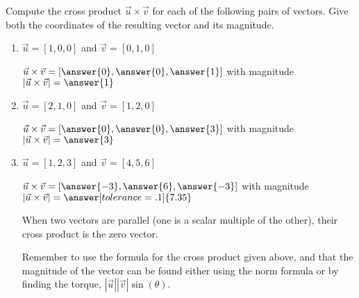 \documentclass{ximera}
\begin{document}
\begin{problem}
    Compute the cross product $\vec{u}\times\vec{v}$ for each of the following pairs of vectors. Give both the coordinates of the resulting vector and its magnitude.
    
    \begin{enumerate}
        \item $\vec{u}=[1,0,0]$ and $\vec{v}=[0,1,0]$
        
        $\vec{u}\times\vec{v}=[\answer{0},\answer{0},\answer{1}]$ with magnitude $|\vec{u}\times\vec{v}|=\answer{1}$
        
        \item $\vec{u}=[2,1,0]$ and $\vec{v}=[1,2,0]$
        
        $\vec{u}\times\vec{v}=[\answer{0},\answer{0},\answer{3}]$ with magnitude $|\vec{u}\times\vec{v}|=\answer{3}$
        
        \item $\vec{u}=[1,2,3]$ and $\vec{v}=[4,5,6]$
        
        $\vec{u}\times\vec{v}=[\answer{-3},\answer{6},\answer{-3}]$ with magnitude $|\vec{u}\times\vec{v}|=\answer[tolerance=.1]{7.35}$
        
        
        
        
        
        
        
        \begin{feedback}
            When two vectors are parallel (one is a scalar multiple of the other), their cross product is the zero vector.

            Remember to use the formula for the cross product given above, and that the magnitude of the vector can be found either using the norm formula or by finding the torque, $|\vec{u}||\vec{v}|\sin(\theta)$.
        \end{feedback}
    \end{enumerate}
\end{problem}
\end{document}
